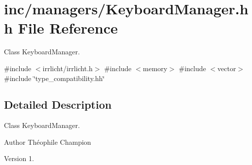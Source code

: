 \hypertarget{KeyboardManager_8hh}{}\section{inc/managers/\+Keyboard\+Manager.hh File Reference}
\label{KeyboardManager_8hh}


Class Keyboard\+Manager.  


{\ttfamily \#include $<$irrlicht/irrlicht.\+h$>$}\newline
{\ttfamily \#include $<$memory$>$}\newline
{\ttfamily \#include $<$vector$>$}\newline
{\ttfamily \#include \char`\"{}type\+\_\+compatibility.\+hh\char`\"{}}\newline


\subsection{Detailed Description}
Class Keyboard\+Manager. 

\begin{DoxyAuthor}{Author}
Théophile Champion 
\end{DoxyAuthor}
\begin{DoxyVersion}{Version}
1. 
\end{DoxyVersion}
